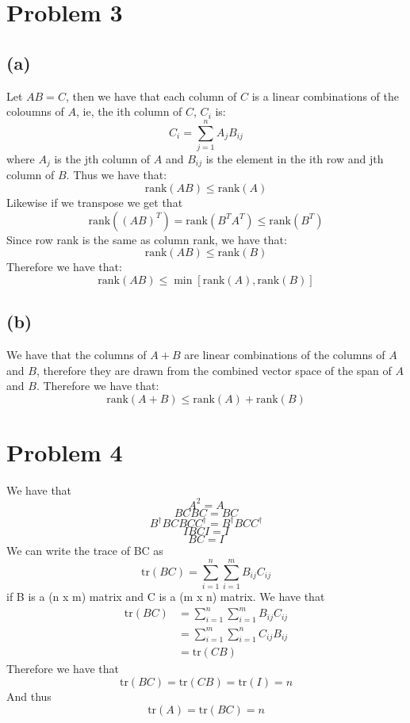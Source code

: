 \section*{Problem 3}
\subsection*{(a)}
Let $AB=C$, then we have that each column of $C$ is a linear combinations of the coloumns of $A$, ie, the ith 
column of $C$, $C_i$ is:
$$
C_i = \sum_{j=1}^{n}A_{j}B_{ij}
$$
where $A_j$ is the jth column of $A$ and $B_{ij}$ is the element in the ith row and jth column of $B$. Thus we have that:
$$
\text{rank}(AB)\leq \text{rank}(A)
$$
Likewise if we transpose we get that 
$$
\text{rank}((AB)^T)=\text{rank}(B^TA^T)\leq \text{rank}(B^T)
$$
Since row rank is the same as column rank, we have that:
$$
\text{rank}(AB)\leq \text{rank}(B)
$$
Therefore we have that:
$$
\text{rank}(AB)\leq \min\left[\text{rank}(A), \text{rank}(B)\right] 
$$
\subsection*{(b)}
We have that the columns of $A+B$ are linear combinations of the columns of $A$ and $B$, therefore they are drawn from 
the combined vector space of the span of $A$ and $B$. Therefore we have that:
$$
\text{rank}(A+B)\leq \text{rank}(A)+\text{rank}(B)
$$
\section*{Problem 4}
We have that 
$$A^2=A$$
$$BCBC=BC$$
$$B^{\dagger}BCBCC^{\dagger}=B^{\dagger}BCC^{\dagger}$$
$$IBCI=I$$
$$BC=I$$
We can write the trace of BC as
$$
\text{tr}(BC)=\sum_{i=1}^{n}\sum_{i=1}^{m}B_{ij}C_{ij}
$$
if B is a (n x m) matrix and C is a (m x n) matrix. We have that 
\begin{align*}
    \text{tr}(BC)&=\sum_{i=1}^{n}\sum_{i=1}^{m}B_{ij}C_{ij}\\
    &=\sum_{i=1}^{m}\sum_{i=1}^{n}C_{ij}B_{ij}\\
    &=\text{tr}(CB)
\end{align*}
Therefore we have that 
$$
\text{tr}(BC)=\text{tr}(CB)=\text{tr}(I)=n
$$
And thus 
$$
\text{tr}(A)=\text{tr}(BC)=n
$$

